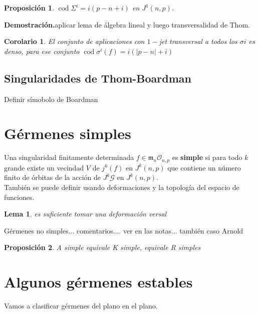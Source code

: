 \documentclass[12pt]{book}
\newtheorem{lem}{Lema}
\newtheorem{pro}{Proposición}
\newtheorem{cor}{Corolario}
\newcommand{\mm}{\mathfrak{m}_n}
\newcommand{\dem}{\textbf{Demostración.}}
\newcommand{\cod}{\operatorname{cod}}
\begin{document}
\begin{pro}
$\cod \Sigma ^i = i (p-n+i)$ en $J^1(n,p)$. 
\end{pro}

\dem aplicar lema de álgebra lineal y luego transversalidad de Thom.\\

\begin{cor}
El conjunto de aplicaciones con $1-$jet transversal a todos los $\sigma i$ es denso, para ese conjunto $\cod \sigma ^i (f) = i (|p-n|+i)$
\end{cor}




\subsection{Singularidades de Thom-Boardman}

Definir símobolo de Boardman







\section{Gérmenes simples}

Una singularidad finitamente determinada $f\in \mm \mathcal{O}_{n,p}$ es \textbf{simple} si para todo $k$ grande existe un vecindad $V$ de $j^k(f)$ en $J^k (n,p)$ que contiene un número finito de órbitas de la acción de $ J^k \mathcal{G} $ en $ J^k (n,p)$.\\
También se puede definir usando deformaciones y la topología del espacio de funciones.
\begin{lem}
es suficiente tomar una deformación versal
\end{lem}
Gérmenes no simples... comentarios.... ver en las notas... también caso Arnold

\begin{pro}
A simple equivale K simple, equivale R simples
\end{pro}






\section{Algunos gérmenes estables}

Vamos a clasificar gérmenes del plano en el plano.
\end{document}
